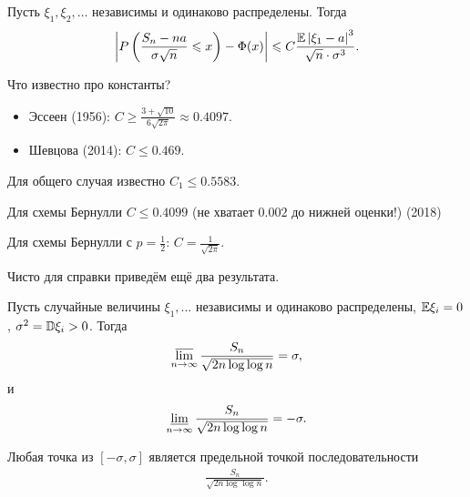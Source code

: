 \documentclass[../main.tex]{subfiles}
\begin{document}
\begin{thm}
 Пусть $ \xi_1, \xi_2, \ldots $ независимы и одинаково распределены.  Тогда
\begin{align*}
\left| P \left( \frac{S_n - na}{\sigma \sqrt n} \leqslant x \right) - \Phi(x) \right| \leqslant C \frac{\mathbb E \left| \xi_1 - a \right|^{3}}{\sqrt n \cdot \sigma^{3}}.
\end{align*}
\end{thm}

Что известно про константы?

\begin{itemize}
 \item Эссеен (1956): $ C \geqslant \frac{3 + \sqrt{10}}{6 \sqrt{2\pi}} \approx 0.4097 $.
 \item Шевцова (2014): $ C \leqslant 0.469 $.
\end{itemize}

Для общего случая известно $ C_1 \leqslant 0.5583 $.

Для схемы Бернулли $ C \leqslant 0.4099 $ (не хватает $ 0.002 $ до нижней оценки!) (2018)

Для схемы Бернулли  с $ p = \frac{1}{2} $: $ C = \frac{1}{\sqrt{2\pi}} $.

Чисто для справки приведём ещё два результата.

\begin{thm}
 Пусть случайные величины $ \xi_1, \ldots $ независимы и одинаково распределены, $ \mathbb E \xi_i = 0 $, $ \sigma^{2} = \mathbb D \xi_i > 0 $. Тогда
 \begin{align*}
  \varlimsup_{n \to \infty} \frac{S_n}{\sqrt{2n \log\log n}} = \sigma,
 \end{align*} и
 \begin{align*}
  \varliminf_{n \to \infty} \frac{S_n}{\sqrt{2n \log\log n}} = -\sigma.
 \end{align*}
\end{thm}

\begin{thm}[Штрассена]
 Любая точка из $ [-\sigma, \sigma] $ является предельной точкой последовательности
  \begin{align*}
   \frac{S_n}{\sqrt{2 n \log \log n}}.
 \end{align*}
\end{thm}
\end{document}
